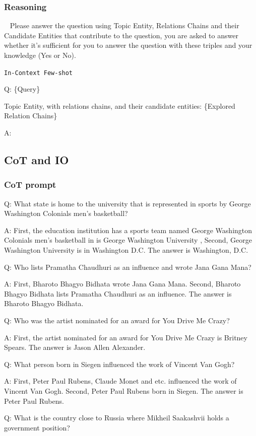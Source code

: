 \documentclass{article} %
\begin{document}
\subsubsection{Reasoning}~\label{prompts4togr}
Please answer the question using Topic Entity,  Relations Chains and their Candidate Entities that contribute to the question, you are asked to answer whether it's sufficient for you to answer the question with these triples and your knowledge (Yes or No).

\texttt{In-Context Few-shot}

Q: \{Query\} 

Topic Entity, with relations chains, and their candidate entities: \{Explored Relation Chains\} 

A: 

\subsection{CoT and IO}
\subsubsection{CoT prompt}
Q: What state is home to the university that is represented in sports by George Washington Colonials men's basketball?

A: First, the education institution has a sports team named George Washington Colonials men's basketball in is George Washington University , Second, George Washington University is in Washington D.C. The answer is Washington, D.C.

Q: Who lists Pramatha Chaudhuri as an influence and wrote Jana Gana Mana?

A: First, Bharoto Bhagyo Bidhata wrote Jana Gana Mana. Second, Bharoto Bhagyo Bidhata lists Pramatha Chaudhuri as an influence. The answer is Bharoto Bhagyo Bidhata.

Q: Who was the artist nominated for an award for You Drive Me Crazy?

A: First, the artist nominated for an award for You Drive Me Crazy is Britney Spears. The answer is Jason Allen Alexander.

Q: What person born in Siegen influenced the work of Vincent Van Gogh?

A: First, Peter Paul Rubens, Claude Monet and etc. influenced the work of Vincent Van Gogh. Second, Peter Paul Rubens born in Siegen. The answer is Peter Paul Rubens.

Q: What is the country close to Russia where Mikheil Saakashvii holds a government position?
\end{document}
